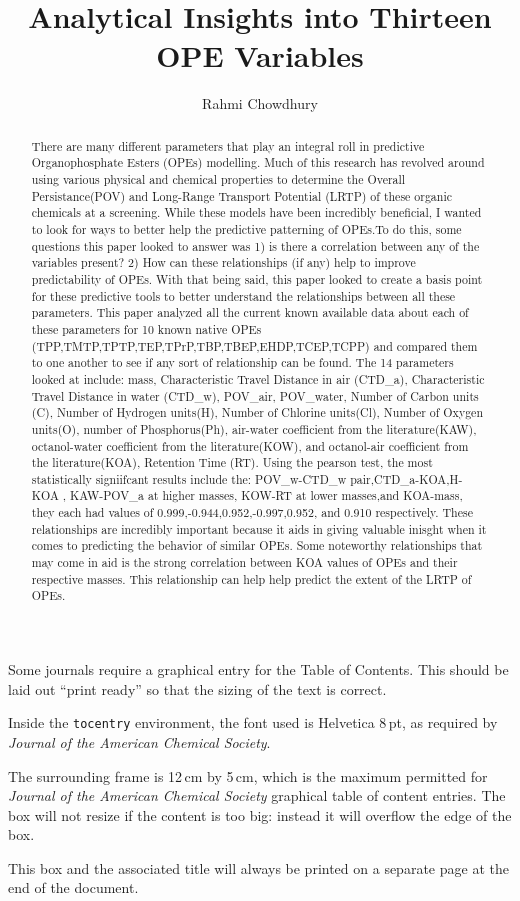 \documentclass[journal=jacsat,manuscript=article]{achemso}
\author{Rahmi Chowdhury}
\affiliation{Department of Chemistry and Biology, Toronto Metropolitan
University,}
\title[An \textsf{achemso} demo]{Analytical Insights into Thirteen OPE
Variables}
\begin{document}
\begin{abstract}
There are many different parameters that play an integral roll in
predictive Organophosphate Esters (OPEs) modelling. Much of this
research has revolved around using various physical and chemical
properties to determine the Overall Persistance(POV) and Long-Range
Transport Potential (LRTP) of these organic chemicals at a screening.
While these models have been incredibly beneficial, I wanted to look for
ways to better help the predictive patterning of OPEs.To do this, some
questions this paper looked to answer was 1) is there a correlation
between any of the variables present? 2) How can these relationships (if
any) help to improve predictability of OPEs. With that being said, this
paper looked to create a basis point for these predictive tools to
better understand the relationships between all these parameters. This
paper analyzed all the current known available data about each of these
parameters for 10 known native OPEs
(TPP,TMTP,TPTP,TEP,TPrP,TBP,TBEP,EHDP,TCEP,TCPP) and compared them to
one another to see if any sort of relationship can be found. The 14
parameters looked at include: mass, Characteristic Travel Distance in
air (CTD\_a), Characteristic Travel Distance in water (CTD\_w),
POV\_air, POV\_water, Number of Carbon units (C), Number of Hydrogen
units(H), Number of Chlorine units(Cl), Number of Oxygen units(O),
number of Phosphorus(Ph), air-water coefficient from the
literature(KAW), octanol-water coefficient from the literature(KOW), and
octanol-air coefficient from the literature(KOA), Retention Time (RT).
Using the pearson test, the most statistically signiifcant results
include the: POV\_w-CTD\_w pair,CTD\_a-KOA,H-KOA , KAW-POV\_a at higher
masses, KOW-RT at lower masses,and KOA-mass, they each had values of
0.999,-0.944,0.952,-0.997,0.952, and 0.910 respectively. These
relationships are incredibly important because it aids in giving
valuable inisght when it comes to predicting the behavior of similar
OPEs. Some noteworthy relationships that may come in aid is the strong
correlation between KOA values of OPEs and their respective masses. This
relationship can help help predict the extent of the LRTP of OPEs.
\end{abstract}
\begin{tocentry}
Some journals require a graphical entry for the Table of Contents.
This should be laid out ``print ready'' so that the sizing of the
text is correct.

Inside the \texttt{tocentry} environment, the font used is Helvetica
8\,pt, as required by \emph{Journal of the American Chemical
Society}.

The surrounding frame is 12\,cm by 5\,cm, which is the maximum
permitted for  \emph{Journal of the American Chemical Society}
graphical table of content entries. The box will not resize if the
content is too big: instead it will overflow the edge of the box.

This box and the associated title will always be printed on a
separate page at the end of the document.
\end{tocentry}
\end{document}
